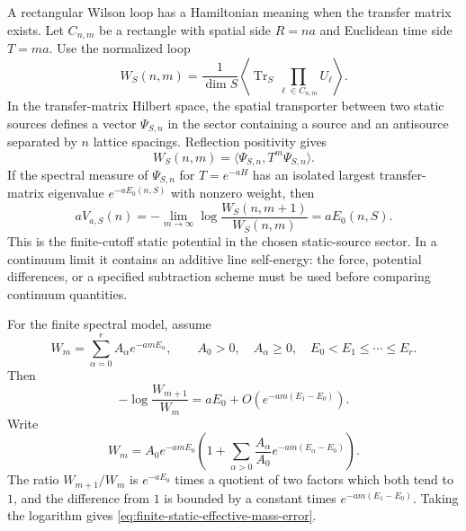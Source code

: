 A rectangular Wilson loop has a Hamiltonian meaning when the transfer matrix
exists.  Let \(C_{n,m}\) be a rectangle with spatial side \(R=na\) and
Euclidean time side \(T=ma\).  Use the normalized loop
\begin{equation}
  W_S(n,m)
  =
  \frac{1}{\dim S}
  \left\langle
    \operatorname{Tr}_S\prod_{\ell\in C_{n,m}}U_\ell
  \right\rangle .
  \label{eq:normalized-rectangular-wilson-loop}
\end{equation}
In the transfer-matrix Hilbert space, the spatial transporter between two
static sources defines a vector \(\Psi_{S,n}\) in the sector containing a
source and an antisource separated by \(n\) lattice spacings.  Reflection
positivity gives
\begin{equation}
  W_S(n,m)=
  \langle \Psi_{S,n},T^m\Psi_{S,n}\rangle .
  \label{eq:rectangular-wilson-loop-transfer-matrix}
\end{equation}
If the spectral measure of \(\Psi_{S,n}\) for \(T=e^{-aH}\) has an isolated
largest transfer-matrix eigenvalue \(e^{-aE_0(n,S)}\) with nonzero weight,
then
\begin{equation}
  aV_{a,S}(n)
  =
  -\lim_{m\to\infty}
  \log\frac{W_S(n,m+1)}{W_S(n,m)}
  =
  aE_0(n,S).
  \label{eq:lattice-static-potential-effective-mass}
\end{equation}
This is the finite-cutoff static potential in the chosen static-source
sector.  In a continuum limit it contains an additive line self-energy:
the force, potential differences, or a specified subtraction scheme must be
used before comparing continuum quantities.

For the finite spectral model, assume
\begin{equation}
  W_m=\sum_{\alpha=0}^{r}A_\alpha e^{-amE_\alpha},
  \qquad
  A_0>0,\quad A_\alpha\ge0,\quad
  E_0<E_1\le\cdots\le E_r .
  \label{eq:finite-static-spectral-sum}
\end{equation}
Then
\begin{equation}
  -\log\frac{W_{m+1}}{W_m}
  =
  aE_0+O(e^{-am(E_1-E_0)}).
  \label{eq:finite-static-effective-mass-error}
\end{equation}
Write
\[
  W_m=A_0e^{-amE_0}
  \left(
    1+\sum_{\alpha>0}\frac{A_\alpha}{A_0}
    e^{-am(E_\alpha-E_0)}
  \right).
\]
The ratio \(W_{m+1}/W_m\) is \(e^{-aE_0}\) times a quotient of two factors
which both tend to \(1\), and the difference from \(1\) is bounded by a
constant times \(e^{-am(E_1-E_0)}\).  Taking the logarithm gives
\eqref{eq:finite-static-effective-mass-error}.


